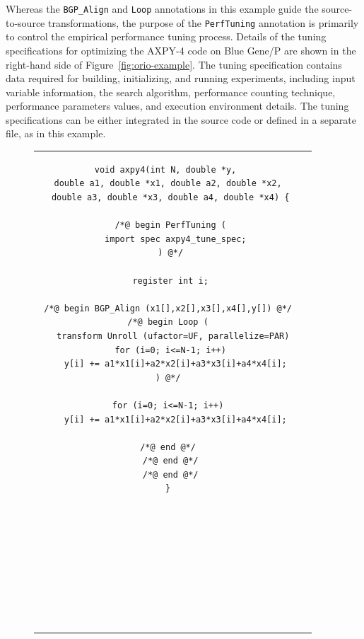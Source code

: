 Whereas the \texttt{BGP\_Align} and \texttt{Loop} annotations in this example
guide the source-to-source transformations, the purpose of the
\texttt{PerfTuning} annotation is primarily to control the empirical
performance tuning process. Details of the tuning specifications for
optimizing the AXPY-4 code on Blue Gene/P are shown in the right-hand side of
Figure~\ref{fig:orio-example}.  The tuning specification contains data
required for building, initializing, and running experiments, including input
variable information, the search algorithm, performance counting technique,
performance parameters values, and execution environment details.  The tuning
specifications can be either integrated in the source code or defined in a
separate file, as in this example.

\begin{figure}[thb] 
\centering 
\begin{tabular}{cc} 
\begin{minipage}{.5\textwidth}  
\scriptsize
\begin{verbatim}  
void axpy4(int N, double *y, 
 double a1, double *x1, double a2, double *x2, 
 double a3, double *x3, double a4, double *x4) {

 /*@ begin PerfTuning (
   import spec axpy4_tune_spec;
 ) @*/

 register int i;

 /*@ begin BGP_Align (x1[],x2[],x3[],x4[],y[]) @*/ 
 /*@ begin Loop ( 
  transform Unroll (ufactor=UF, parallelize=PAR)
  for (i=0; i<=N-1; i++) 
    y[i] += a1*x1[i]+a2*x2[i]+a3*x3[i]+a4*x4[i]; 
 ) @*/ 

 for (i=0; i<=N-1; i++) 
   y[i] += a1*x1[i]+a2*x2[i]+a3*x3[i]+a4*x4[i];

 /*@ end @*/ 
 /*@ end @*/
 /*@ end @*/
}










\end{verbatim}
\end{minipage}
\end{tabular}
\end{figure}
